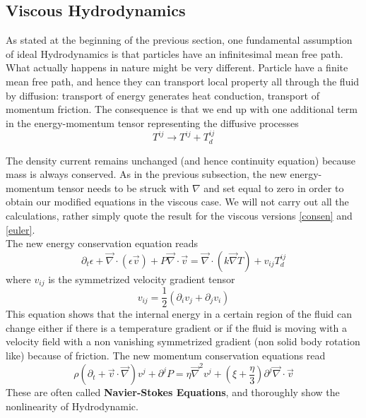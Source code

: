 \subsection{Viscous Hydrodynamics}

As stated at the beginning of the previous section, one fundamental assumption of ideal Hydrodynamics is that particles have an infinitesimal mean free path. What actually happens in nature might be very different. Particle have a finite mean free path, and hence they can transport local property all through the fluid by diffusion: transport of energy generates heat conduction, transport of momentum friction. The consequence is that we end up with one additional term in the energy-momentum tensor representing the diffusive processes
$$
T^{ij} \to T^{ij} + T^{ij}_d 
$$

The density current remains unchanged (and hence continuity equation) because mass is always conserved. As in the previous subsection, the new energy-momentum tensor needs to be struck with $\nabla$ and set equal to zero in order to obtain our modified equations in the viscous case. We will not carry out all the calculations, rather simply quote the result for the viscous versions \ref{consen} and \ref{euler}. \\
The new energy conservation equation reads
$$
\partial_t \epsilon + \vec \nabla \cdot (\epsilon \vec{v}) + P \vec \nabla \cdot \vec{v} = \vec \nabla \cdot (k \vec \nabla T) + v_{ij} T_d^{ij} 
$$
where $v_{ij}$ is the symmetrized velocity gradient tensor
$$
v_{ij} = \frac{1}{2}(\partial_i v_j + \partial_j v_i)
$$
This equation shows that the internal energy in a certain region of the fluid can change either if there is a temperature gradient or if the fluid is moving with a velocity field with a non vanishing symmetrized gradient (non solid body rotation like) because of friction.
The new momentum conservation equations read
$$
\rho \left( \partial_t + \vec{v} \cdot \vec \nabla \right) v^j+\partial^jP = \eta \vec \nabla^2v^j + \left( \xi + \frac{\eta}{3} \right) \partial^j \vec \nabla \cdot \vec{v}
$$
These are often called \textbf{Navier-Stokes Equations}, and thoroughly show the nonlinearity of Hydrodynamic.


